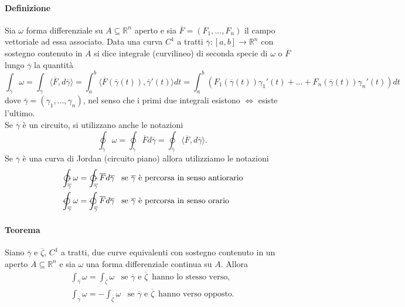 \documentclass{article}
\newcommand{\R}{\mathbb{R}}
\begin{document}
\paragraph{{Definizione}}
Sia $\omega$ forma differenziale su $A \subseteq \R^n$ aperto e sia $\overline{F}=(F_1,...,F_n)$ il campo vettoriale ad essa associato. Data una curva $C^1$ a tratti $\overline{\gamma} :[a,b]\rightarrow \R^n$ con sostegno contenuto in $A$ si dice integrale (curvilineo) di seconda specie di $\omega$ o $\overline{F}$ lungo $\overline{\gamma}$ la quantità
\begin{equation*}
    \int_{\overline{\gamma}}\omega = \int_{\overline{\gamma}}\langle \overline{F},d\overline{\gamma} \rangle = \int_a^b \langle \overline{F}(\overline{\gamma}(t)),\overline{\gamma}'(t) \rangle dt=\int_a^b (F_1 (\overline{\gamma}(t))\gamma_1'(t)+...+F_n(\overline{\gamma}(t))\gamma_n'(t))dt
\end{equation*}
 dove $\overline{\gamma}=(\gamma_1,...,\gamma_n)$, nel senso che i primi due integrali esistono $\Leftrightarrow $ esiste l'ultimo.\\
  Se $\overline{\gamma} $ è un circuito, si utilizzano anche le notazioni
  \begin{equation*}
      \oint_{\overline{\gamma}} \omega= \oint_{\overline{\gamma}} \overline{F} d\overline{\gamma} = \oint_{\overline{\gamma}}\langle \overline{F},d\overline{\gamma} \rangle.
  \end{equation*}
  Se $\overline{\gamma}$ è una curva di Jordan (circuito piano) allora utilizziamo le notazioni
  \begin{align*}
      &\ointctrclockwise_{\overline{\gamma}} \omega=\ointctrclockwise_{\overline{\gamma}}\overline{F}d\overline{\gamma}\,\,\,\,\, \text{se} \,\, \overline{\gamma}\,\, \text{è percorsa in senso antiorario} \\
      &\ointclockwise_{\overline{\gamma}}\omega=\ointclockwise_{\overline{\gamma}}\overline{F}d\overline{\gamma} \,\,\,\,\, \text{se} \,\, \overline{\gamma}\,\, \text{è percorsa in senso orario}
  \end{align*}
  
\paragraph{{Teorema}}
Siano $\overline{\gamma}$ e $\overline{\zeta}$, $C^1$ a tratti, due curve equivalenti  con sostegno contenuto in un aperto $A \subseteq \R^n$ e sia $\omega$ una forma differenziale continua su $A$. Allora
\begin{align*}
    \int_{\overline{\gamma}} \omega= \int_{\overline{\zeta}} \omega
    \,\,\,\,\,\text{se}\,\, \overline{\gamma}\,\, \text{e}\,\,\overline{\zeta}\,\,\, \text{hanno lo stesso verso,}\\
    \int_{\overline{\gamma}}\omega= -\int_{\overline{\zeta}} \omega 
    \,\,\,\,\,\text{se} \,\,\overline{\gamma} \,\, \text{e}\,\,\overline{\zeta} \,\,\,\text{hanno verso opposto.}
\end{align*}
\end{document}
